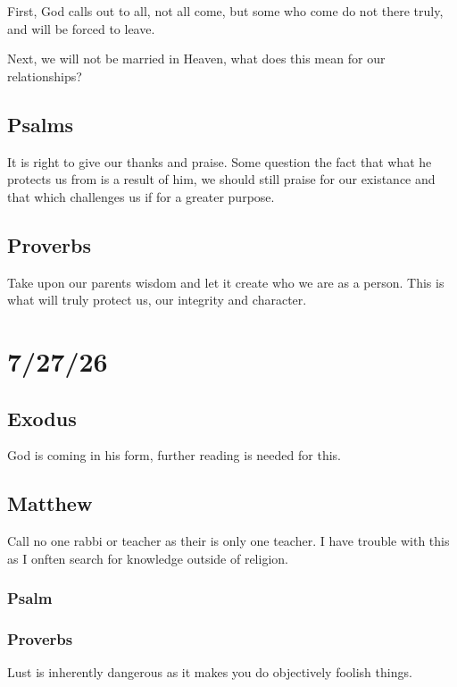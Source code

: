 First, God calls out to all, not all come, but some who come do not there truly, and will be forced to leave.

Next, we will not be married in Heaven, what does this mean for our relationships?

\subsection{Psalms}

It is right to give our thanks and praise. Some question the fact that what he protects us from is a result of him, we should still praise for our existance and that which challenges us if for a greater purpose.

\subsection{Proverbs}

Take upon our parents wisdom and let it create who we are as a person. This is what will truly protect us, our integrity and character.

\section{7/27/26}

\subsection{Exodus}
God is coming in his form, further reading is needed for this.

\subsection{Matthew}

Call no one rabbi or teacher as their is only one teacher. I have trouble with this as I onften search for knowledge outside of religion.

\subsubsection{Psalm}

\subsubsection{Proverbs}

Lust is inherently dangerous as it makes you do objectively foolish things.
